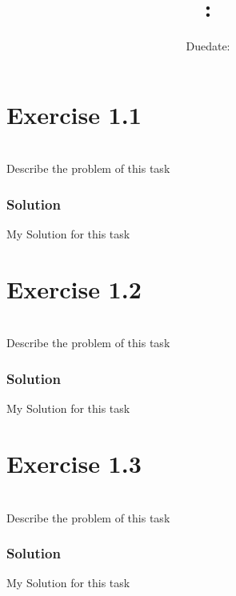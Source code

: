 \documentclass[oneside]{article}
\title{
    \textsf{\textbf{\hmwkSubject: \hmwkTitle}}
}
\author{\hmwkAuthor}
\date{Duedate: \hmwkDueDate}
\begin{document}
\maketitle
\thispagestyle{firststyle}
\vspace{1cm}


\section*{Exercise 1.1}
\\
Describe the problem of this task


\subsubsection*{Solution}
My Solution for this task

\pagebreak

\section*{Exercise 1.2}
\\
Describe the problem of this task


\subsubsection*{Solution}
My Solution for this task

\pagebreak

\section*{Exercise 1.3}
\\
Describe the problem of this task


\subsubsection*{Solution}
My Solution for this task

\pagebreak
\end{document}
